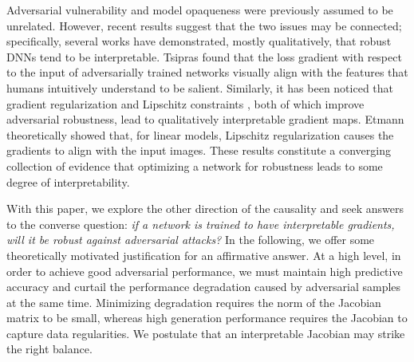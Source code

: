 Adversarial vulnerability and model opaqueness were previously assumed to be unrelated. However, recent results suggest that the two issues may be connected; specifically, several works have demonstrated, mostly qualitatively, that robust DNNs tend to be interpretable. Tsipras \etal \cite{robustness_vs_accuracy} found that the loss gradient with respect to the input of adversarially trained networks visually align with the features that humans intuitively understand to be salient. Similarly, it has been noticed that gradient regularization \cite{input_grad_reg} and Lipschitz constraints \cite{lipschitz_nets_interp}, both of which improve adversarial robustness, lead to qualitatively interpretable gradient maps.
Etmann \etal \cite{robustness_interpretability} theoretically showed that, for linear models, Lipschitz regularization causes the gradients to align with the input images. These results constitute a converging collection of evidence that optimizing a network for robustness leads to some degree of interpretability.

With this paper, we explore the other direction of the causality and seek answers to the converse question: \emph{if a network is trained to have interpretable gradients, will it be robust against adversarial attacks?} In the following, we offer some theoretically motivated justification for an affirmative answer. At a high level, in order to achieve good adversarial performance, we must maintain high predictive accuracy and curtail the performance degradation caused by adversarial samples at the same time. Minimizing degradation requires the norm of the Jacobian matrix to be small, whereas high generation performance requires the Jacobian to capture data regularities. We postulate that an interpretable Jacobian may strike the right balance. 


